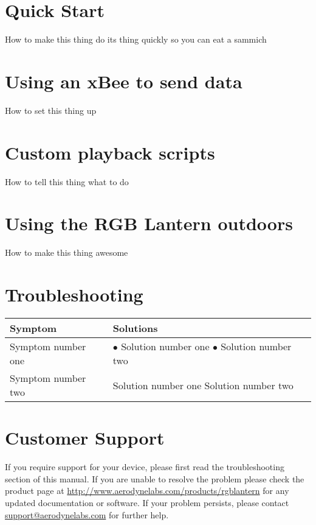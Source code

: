 \documentclass[letterpaper,twoside]{article}
\begin{document}
\section{Quick Start}
How to make this thing do its thing quickly so you can eat a sammich

\section{Using an xBee to send data}
How to set this thing up

\section{Custom playback scripts}
How to tell this thing what to do

\section{Using the RGB Lantern outdoors}
How to make this thing awesome

\appendix
\newpage
\section*{Troubleshooting}
\begin{center}
\begin{tabular}{l | p{}}
Symptom & Solutions \\
\hline
Symptom number one &%
$\bullet$ Solution number one\newline
$\bullet$ Solution number two\\
Symptom number two &%
Solution number one\newline
Solution number two
\end{tabular}
\end{center}

\section*{Customer Support}
If you require support for your device, please first read the troubleshooting section of this manual. If you are unable to resolve the problem please check the product page at \url{http://www.aerodynelabs.com/products/rgblantern} for any updated documentation or software. If your problem persists, please contact \url{support@aerodynelabs.com} for further help.
\end{document}
